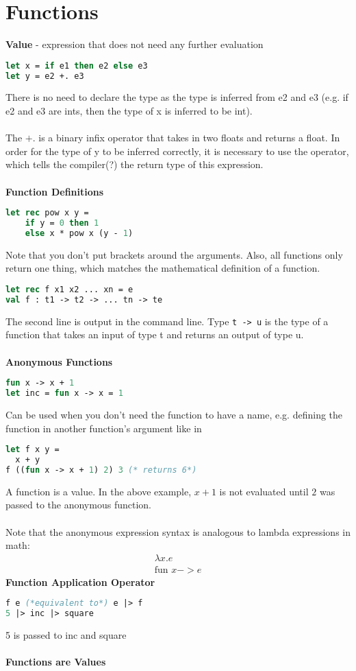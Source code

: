 \documentclass[12pt,a4paper]{article} %
\begin{document}
\section{Functions}
\textbf{Value} - expression that does not need any further evaluation
\begin{lstlisting}[language = Caml]
let x = if e1 then e2 else e3
let y = e2 +. e3
\end{lstlisting}
There is no need to declare the type as the type is inferred from e2 and e3 (e.g. if e2 and e3 are ints, then the type of x is inferred to be int).
\\\\
The $+.$ is a binary infix operator that takes in two floats and returns a float. In order for the type of y to be inferred correctly, it is necessary to use the operator, which tells the compiler(?) the return type of this expression.
\\\\
\textbf{Function Definitions}
\begin{lstlisting}[language = Caml]
let rec pow x y = 
	if y = 0 then 1
	else x * pow x (y - 1)
\end{lstlisting}
Note that you don't put brackets around the arguments. Also, all functions only return one thing, which matches the mathematical definition of a function.
\begin{lstlisting}[language = Caml]
let rec f x1 x2 ... xn = e
val f : t1 -> t2 -> ... tn -> te
\end{lstlisting}
The second line is output in the command line. Type \verb|t -> u| is the type of a function that takes an input of type t and returns an output of type u.
\\\\
\textbf{Anonymous Functions}
\begin{lstlisting}[language = Caml]
fun x -> x + 1
let inc = fun x -> x = 1
\end{lstlisting}
Can be used when you don't need the function to have a name, e.g. defining the function in another function's argument like in
\begin{lstlisting}[language = Caml]
let f x y = 
  x + y
f ((fun x -> x + 1) 2) 3 (* returns 6*)
\end{lstlisting}
A function is a value. In the above example, $ x+1 $ is not evaluated until $ 2$ was passed to the anonymous function.
\\\\
Note that the anonymous expression syntax is analogous to lambda expressions in math:
\begin{align*}
	\lambda x.e\\
	\text{fun }x -> e
\end{align*}
\textbf{Function Application Operator}
\begin{lstlisting}[language = Caml]
f e (*equivalent to*) e |> f
5 |> inc |> square
\end{lstlisting}
5 is passed to inc and square
\\\\
\textbf{Functions are Values}
\end{document}
